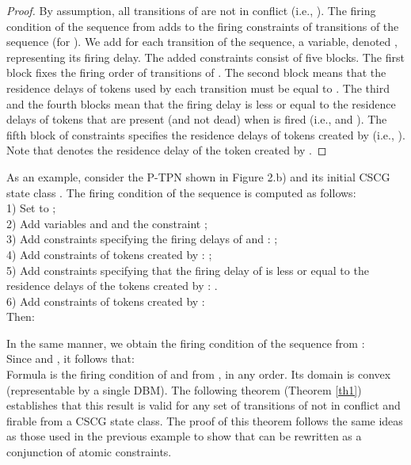 \documentclass[submission,copyright,creativecommons]{eptcs}
\newtheorem{proof}{Proof}
\numberwithin{equation}{section}
\begin{document}
\begin{proof} By assumption, all transitions of  are not in conflict (i.e., ). The firing condition of the sequence  from  adds to  the firing constraints of transitions of the sequence (for ). We add for each transition   of the sequence, a variable, denoted , representing its firing delay. The added constraints consist of five blocks. The first block fixes the firing order of transitions of . The second block means that the residence delays of tokens used by each transition  must be equal to . The third and the fourth blocks mean that the firing delay  is less or equal to the residence delays of tokens that are present (and not dead) when  is fired (i.e.,  and ). The fifth block of constraints specifies the residence delays of tokens created by  (i.e., ). Note that  denotes the residence delay of the token  created by . \normalsize
\end{proof}
\par As an example, consider the P-TPN shown in Figure 2.b) and its
initial CSCG state class . The firing condition  of the sequence  is computed as follows:\\
1) Set  to ;\\
2) Add variables  and  and the constraint ;\\
3) Add constraints specifying the firing delays of  and :  ;\\
4) Add constraints of tokens created by : ;\\
5) Add constraints specifying that the firing delay of  is less or equal to the residence delays of the tokens created by : .\\
6) Add constraints of tokens created by : \\
Then: 
 
In the same manner, we obtain the firing condition  of the sequence  from : \\


  Since  and  , it follows that:\\
  
Formula  is the firing condition of  and  from , in any order. Its domain is convex (representable by a single DBM).
The following theorem (Theorem \ref{th1}) establishes that this result is valid for any set of transitions of  not in conflict and firable from a CSCG state class. The proof of this theorem follows the same ideas as those used in the previous example to show that  can be rewritten as a conjunction of atomic constraints.
\end{document}
